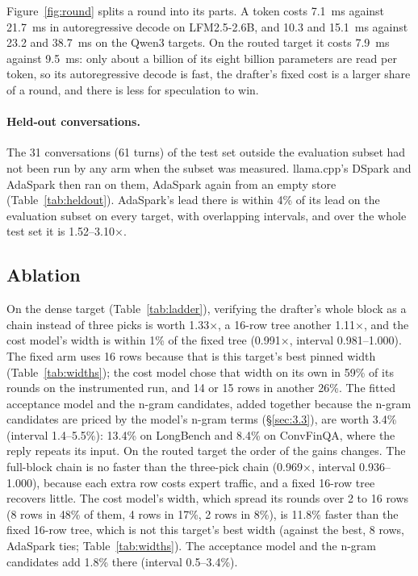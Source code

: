 \documentclass[10pt,twocolumn,letterpaper]{article}
\begin{document}




Figure~\ref{fig:round} splits a round into its parts. A token costs 7.1~ms against 21.7~ms in autoregressive decode on LFM2.5-2.6B, and 10.3 and 15.1~ms against 23.2 and 38.7~ms on the Qwen3 targets. On the routed target it costs 7.9~ms against 9.5~ms: only about a billion of its eight billion parameters are read per token, so its autoregressive decode is fast, the drafter's fixed cost is a larger share of a round, and there is less for speculation to win.

\paragraph{Held-out conversations.} The 31 conversations (61 turns) of the test set outside the evaluation subset had not been run by any arm when the subset was measured. llama.cpp's DSpark and AdaSpark then ran on them, AdaSpark again from an empty store (Table~\ref{tab:heldout}). AdaSpark's lead there is within 4\% of its lead on the evaluation subset on every target, with overlapping intervals, and over the whole test set it is 1.52--3.10$\times$.



\subsection{Ablation}\label{sec:4.2}



On the dense target (Table~\ref{tab:ladder}), verifying the drafter's whole block as a chain instead of three picks is worth 1.33$\times$, a 16-row tree another 1.11$\times$, and the cost model's width is within 1\% of the fixed tree (0.991$\times$, interval 0.981--1.000). The fixed arm uses 16 rows because that is this target's best pinned width (Table~\ref{tab:widths}); the cost model chose that width on its own in 59\% of its rounds on the instrumented run, and 14 or 15 rows in another 26\%. The fitted acceptance model and the n-gram candidates, added together because the n-gram candidates are priced by the model's n-gram terms (\S\ref{sec:3.3}), are worth 3.4\% (interval 1.4--5.5\%): 13.4\% on LongBench and 8.4\% on ConvFinQA, where the reply repeats its input. On the routed target the order of the gains changes. The full-block chain is no faster than the three-pick chain (0.969$\times$, interval 0.936--1.000), because each extra row costs expert traffic, and a fixed 16-row tree recovers little. The cost model's width, which spread its rounds over 2 to 16 rows (8 rows in 48\% of them, 4 rows in 17\%, 2 rows in 8\%), is 11.8\% faster than the fixed 16-row tree, which is not this target's best width (against the best, 8 rows, AdaSpark ties; Table~\ref{tab:widths}). The acceptance model and the n-gram candidates add 1.8\% there (interval 0.5--3.4\%).
\end{document}
